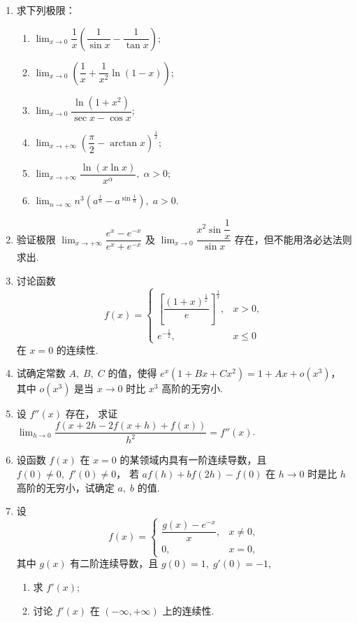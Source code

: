\begin{enumerate}
    \item 求下列极限：
    \begin{enumerate}[(1)]\setlength{\itemsep}{5pt}\setlength{\topsep}{15pt}
        \item $\displaystyle\lim_{x\to0}\dfrac{1}{x}\left(\dfrac{1}{\sin x}-\dfrac{1}{\tan x}\right)$;
        \item $\displaystyle\lim_{x\to0}\left(\dfrac{1}{x}+\dfrac{1}{x^2}\ln(1-x)\right)$;
        \item $\displaystyle\lim_{x\to0}\dfrac{\ln(1+x^2)}{\sec x-\cos x}$;
        \item $\displaystyle\lim_{x\to+\infty}\left(\dfrac{\pi}{2}-\arctan x\right)^{\frac{1}{x}}$;
        \item $\displaystyle\lim_{x\to+\infty}\dfrac{\ln(x\ln x)}{x^{\alpha}},\;\alpha>0$;
        \item $\displaystyle\lim_{n\to\infty}n^3(a^{\frac{1}{n}}-a^{\sin\frac{1}{n}}),\;a>0$.
    \end{enumerate}

    \item 验证极限 $\displaystyle\lim_{x\to+\infty}\dfrac{e^x-e^{-x}}{e^x+e^{-x}}$ 
    及  $\displaystyle\lim_{x\to0}\dfrac{x^2\sin\dfrac{1}{x}}{\sin x}$ 存在，但不能用洛必达法则求出.

    \item 讨论函数
    \[
        f(x)=\begin{cases}
            \left[\dfrac{(1+x)^{\frac{1}{x}}}{e}\right]^{\frac{1}{x}},&x>0,\\
            e^{-\frac{1}{2}},&x\leqslant0
        \end{cases}
    \]
    在 $x=0$ 的连续性.

    \item 试确定常数 $A,\;B,\;C$ 的值，使得 $e^x(1+Bx+Cx^2)=1+Ax+o(x^3)$，
    其中 $o(x^3)$ 是当 $x\to0$ 时比 $x^3$ 高阶的无穷小.

    \item 设 $f''(x)$ 存在，
    求证 $\displaystyle\lim_{h\to0}\dfrac{f(x+2h-2f(x+h)+f(x))}{h^2}=f''(x)$.

    \item 设函数 $f(x)$ 在 $x=0$ 的某领域内具有一阶连续导数，且 $f(0)\not=0,\;f'(0)\not=0$，
    若 $af(h)+bf(2h)-f(0)$ 在 $h\to0$ 时是比 $h$ 高阶的无穷小，试确定 $a,\;b$ 的值.

    \item 设
    \[
        f(x)=\begin{cases}
            \dfrac{g(x)-e^{-x}}{x},&x\not=0,\\
            0,&x=0,
        \end{cases}
    \]
    其中 $g(x)$ 有二阶连续导数，且 $g(0)=1,\;g'(0)=-1$,
    \begin{enumerate}[(1)]\setlength{\itemsep}{5pt}\setlength{\topsep}{15pt}
        \item 求 $f'(x)$;
        \item 讨论 $f'(x)$ 在 $(-\infty,+\infty)$ 上的连续性.
    \end{enumerate}


\end{enumerate}

